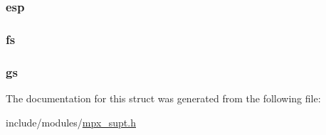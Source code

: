 \subsubsection[{\texorpdfstring{esp}{esp}}]{ esp}\hypertarget{structcontext_a7c8cdb0e23278dc958565ee9a5ebb14b}{}\label{structcontext_a7c8cdb0e23278dc958565ee9a5ebb14b}
\subsubsection[{\texorpdfstring{fs}{fs}}]{ fs}\hypertarget{structcontext_a59556586c5fc48990f50150d95a0735d}{}\label{structcontext_a59556586c5fc48990f50150d95a0735d}
\subsubsection[{\texorpdfstring{gs}{gs}}]{ gs}\hypertarget{structcontext_abcc56997e8024ea8d5d3cf7e1ef6ae3a}{}\label{structcontext_abcc56997e8024ea8d5d3cf7e1ef6ae3a}


The documentation for this struct was generated from the following file\+:\begin{DoxyCompactItemize}
\item 
include/modules/\hyperlink{mpx__supt_8h}{mpx\+\_\+supt.\+h}\end{DoxyCompactItemize}
